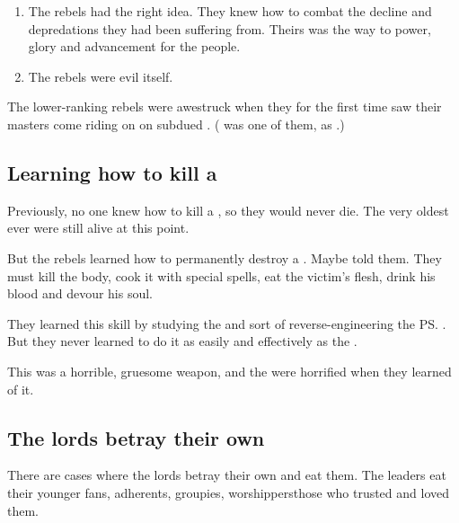 \begin{enumerate}
  \item 
    The rebels had the right idea. 
    They knew how to combat the decline and depredations they had been suffering from. 
    Theirs was the way to power, glory and advancement for the \resphan{} people. 
  \item 
    The rebels were evil itself. 
\end{enumerate}

The lower-ranking rebels were awestruck when they for the first time saw their masters come riding on on subdued \umbrae. 
(\Achsah{} was one of them, as .)









\subsection{Learning how to kill a \resphan}
Previously, no one knew how to kill a \resphan, so they would never die. 
The very oldest \resphain{} ever were still alive at this point. 

But the rebels learned how to permanently destroy a \resphan. 
Maybe \Semiza{} told them. 
They must kill the body, cook it with special spells, eat the victim's flesh, drink his blood and devour his soul. 

They learned this skill by studying the  and sort of reverse-engineering the \ps{\umbrae} . 
But they never learned to do it as easily and effectively as the \umbrae{}. 

This was a horrible, gruesome weapon, and the \Merkyrans{} were horrified when they learned of it. 









\subsection{The \resphan{} lords betray their own}
There are cases where the \resphan{} lords betray their own and eat them. 
The leaders eat their younger fans, adherents, groupies, worshippers\dash those who trusted and loved them. 

